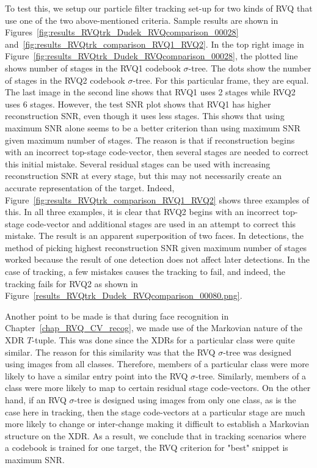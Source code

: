 To test this, we setup our particle filter tracking set-up for two kinds of RVQ that use one of the two above-mentioned criteria.  Sample results are shown in Figures~\ref{fig:results_RVQtrk_Dudek_RVQcomparison_00028} and~\ref{fig:results_RVQtrk_comparison_RVQ1_RVQ2}.  In the top right image in Figure~\ref{fig:results_RVQtrk_Dudek_RVQcomparison_00028}, the plotted line shows number of stages in the RVQ1 codebook $\sigma$-tree.  The dots show the number of stages in the RVQ2 codebook $\sigma$-tree.  For this particular frame, they are equal.  The last image in the second line shows that RVQ1 uses 2 stages while RVQ2 uses 6 stages.  However, the test SNR plot shows that RVQ1 has higher reconstruction SNR, even though it uses less stages.  This shows that using maximum SNR alone seems to be a better criterion than using maximum SNR given maximum number of stages.  The reason is that if reconstruction begins with an incorrect top-stage code-vector, then several stages are needed to correct this initial mistake.  Several residual stages can be used with increasing reconstruction SNR at every stage, but this may not necessarily create an accurate representation of the target.  Indeed, Figure~\ref{fig:results_RVQtrk_comparison_RVQ1_RVQ2} shows three examples of this.  In all three examples, it is clear that RVQ2 begins with an incorrect top-stage code-vector and additional stages are used in an attempt to correct this mistake.  The result is an apparent superposition of two faces.  In detections, the method of picking highest reconstruction SNR given maximum number of stages worked because the result of one detection does not affect later detections.  In the case of tracking, a few mistakes causes the tracking to fail, and indeed, the tracking fails for RVQ2 as shown in Figure~\ref{results_RVQtrk_Dudek_RVQcomparison_00080.png}. 

Another point to be made is that during face recognition in Chapter~\ref{chap_RVQ_CV_recog}, we made use of the Markovian nature of the XDR $T$-tuple.  This was done since the XDRs for a particular class were quite similar.  The reason for this similarity was that the RVQ $\sigma$-tree was designed using images from all classes.  Therefore, members of a particular class were more likely to have a similar entry point into the RVQ $\sigma$-tree.  Similarly, members of a class were more likely to map to certain residual stage code-vectors.  On the other hand, if an RVQ $\sigma$-tree is designed using images from only one class, as is the case here in tracking, then the stage code-vectors at a particular stage are much more likely to change or inter-change making it difficult to establish a Markovian structure on the XDR.  As a result, we conclude that in tracking scenarios where a codebook is trained for one target, the RVQ criterion for "best" snippet is maximum SNR.

